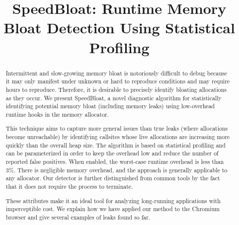 \documentclass[preprint, numbers]{sigplanconf}
\begin{document}
\setlength{\pdfpageheight}{\paperheight}
\setlength{\pdfpagewidth}{\paperwidth}




\title{SpeedBloat: Runtime Memory Bloat Detection Using Statistical Profiling}
\subtitle{}

\iffalse
\authorinfo{Micha{\l} W{\l}odarczyk}%
           {University of Warsaw}
           {m.wlodarczyk@mimuw.edu.pl}
\authorinfo{Ben Cheng}
           {Google Inc.}
           {bccheng@google.com}
\authorinfo{Simon Que}
           {Google Inc.}
           {sque@google.com}
\fi
{}

\maketitle

\begin{abstract}
Intermittent and slow-growing memory bloat is notoriously difficult to
debug because it may only manifest under unknown or hard to
reproduce conditions and may require hours to reproduce.  Therefore,
it is desirable to precisely identify bloating allocations as they
occur.  We present SpeedBloat, a novel diagnostic algorithm for statistically
identifying potential memory bloat (including memory leaks) using
low-overhead runtime hooks in the memory allocator.

This technique aims to capture more general issues than true leaks
(where allocations become unreachable) by identifying callsites whose
live allocations are increasing more quickly than the overall heap size.
The algorithm is based on statistical profiling and can be parameterized in order to
keep the overhead low and reduce the number of reported false positives.
When enabled, the worst-case runtime overhead is less than 3\%.
There is negligible memory overhead, and the approach is generally applicable to any allocator.
Our detector is further distinguished from common tools by the fact that
it does not require the process to terminate.

These attributes make it an ideal tool for analyzing long-running applications with imperceptible cost.
We explain how we have applied our method to the Chromium browser and give
several examples of leaks found so far.
\end{abstract}
\end{document}
